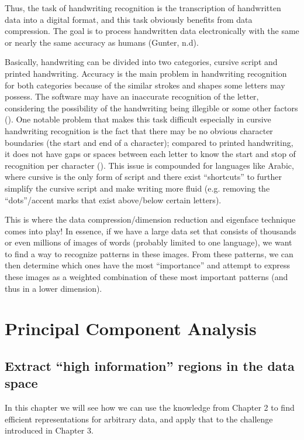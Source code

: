 \documentclass[12pt]{report}
\begin{document}
            Thus, the task of handwriting recognition is the transcription of handwritten data into a digital format, and this task obviously benefits from data compression. The goal is to process handwritten data electronically with the same or nearly the same accuracy as humans (Gunter, n.d).
            
            Basically, handwriting can be divided into two categories, cursive script and printed handwriting. Accuracy is the main problem in handwriting recognition for both categories because of the similar strokes and shapes some letters may possess. The software may have an inaccurate recognition of the letter, considering the possibility of the handwriting being illegible or some other factors (). One notable problem that makes this task difficult especially in cursive handwriting recognition is the fact that there may be no obvious character boundaries (the start and end of a character); compared to printed handwriting, it does not have gaps or spaces between each letter to know the start and stop of recognition per character (). This issue is compounded for languages like Arabic, where cursive is the only form of script and there exist ``shortcuts'' to further simplify the cursive script and make writing more fluid (e.g. removing the ``dots''/accent marks that exist above/below certain letters).
            
            This is where the data compression/dimension reduction and eigenface technique comes into play! In essence, if we have a large data set that consists of thousands or even millions of images of words (probably limited to one language), we want to find a way to recognize patterns in these images. From these patterns, we can then determine which ones have the most ``importance'' and attempt to express these images as a weighted combination of these most important patterns (and thus in a lower dimension).
        
    
    \chapter{Principal Component Analysis}
        \section{Extract ``high information'' regions in the data space}
            In this chapter we will see how we can use the knowledge from Chapter 2 to find efficient representations for arbitrary data, and apply that to the challenge introduced in Chapter 3.
\end{document}
